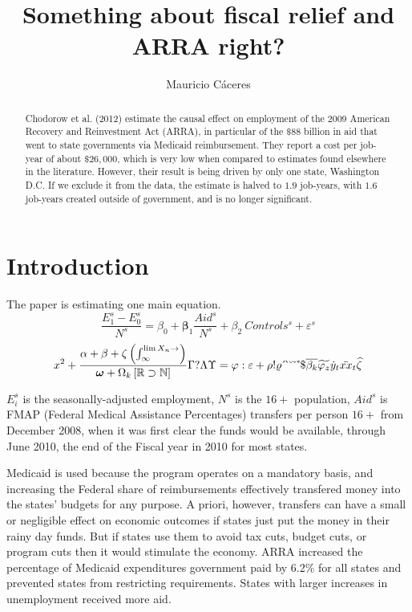 \documentclass[11pt]{article}
\title{Something about fiscal relief and ARRA right?}
\author{Mauricio C\'aceres}
\begin{document}
\displayoptions

\begin{abstract}
  \noindent Chodorow et al. (2012) estimate the causal effect on employment of the 2009 American Recovery and Reinvestment Act (ARRA), in particular of the $\$88$ billion in aid that went to state governments via Medicaid reimbursement. They report a cost per job-year of about $\$26,000$, which is very low when compared to estimates found elsewhere in the literature. However, their result is being driven by only one state, Washington D.C. If we exclude it from the data, the estimate is halved to $1.9$ job-years, with $1.6$ job-years created outside of government, and is no longer significant.
\end{abstract}

\section{Introduction}
\label{sec:introduction}

The paper is estimating one main equation.
\begin{equation}
  \dfrac{E_1^s - E_0^s}{N^s}
  = \beta_0 + \boldsymbol\beta_1 \dfrac{Aid^s}{N^s} + \beta_2 ~ Controls^s + \varepsilon^s
\end{equation}
\[
  x^2 + \dfrac{\alpha + \beta + \zeta \left(\int_{\infty}^{\lim X_n \to \empty}\right)}{\bm \omega + \Omega_k \left[\mathbb{R} \supset \mathbb{N}\right]}
  \Gamma ? \Lambda\Upsilon = \varphi : \varepsilon + \rho ! \varrho
\acute ~ \grave ~ \breve ~ \check ~ \mathring ~ \mathdollar
\overline{\beta_k} \widetilde{\varphi_z} \dot{y}_t \ddot{xx}_t \widehat{\zeta}
\]

$E_i^s$ is the seasonally-adjusted employment, $N^s$ is the $16+$ population, $Aid^s$ is FMAP (Federal Medical Assistance Percentages) transfers per person $16+$ from December 2008, when it was first clear the funds would be available, through June 2010, the end of the Fiscal year in 2010 for most states.

Medicaid is used because the program operates on a mandatory basis, and increasing the Federal share of reimbursements effectively transfered money into the states' budgets for any purpose. A priori, however, transfers can have a small or negligible effect on economic outcomes if states just put the money in their rainy day funds. But if states use them to avoid tax cuts, budget cuts, or program cuts then it would stimulate the economy. ARRA increased the percentage of Medicaid expenditures government paid by 6.2\% for all states and prevented states from restricting requirements. States with larger increases in unemployment received more aid.
\end{document}
